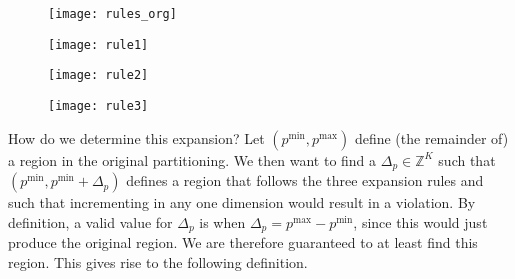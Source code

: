\begin{figure*}[ht]
    \centering
    \begin{subfigure}{0.24\textwidth}
        \texttt{[image: rules\_org]}%
        \caption{}%
        \label{fig:expRulesOrg}
    \end{subfigure}
    \begin{subfigure}{0.24\textwidth}
      \texttt{[image: rule1]}%
      \caption{}%
      \label{fig:expRules1}
    \end{subfigure}
    \begin{subfigure}{0.24\textwidth}
      \texttt{[image: rule2]}%
      \caption{}%
      \label{fig:expRules2}
    \end{subfigure}
    \begin{subfigure}{0.24\textwidth}
      \texttt{[image: rule3]}%
      \caption{}%
      \label{fig:expRules3}
    \end{subfigure}

  \caption{%
      A visual example of the 3 expansion rules. Striped regions indicate that
      the algorithm has covered this part in a previous iteration, whereas the
      shaded region with a dashed border is a candidate expanded
      region.~\cref{fig:expRulesOrg} shows a potential input partitioning.
      In~\cref{fig:expRules1} the expansion is illegal according to Rule 1,
      since the expanded region contains two different actions
      (colors).~\cref{fig:expRules2} violates Rule 2, since the expanded region
      overlaps with a striped area.~\cref{fig:expRules3} shows a representation
      of the 3rd rule, as the expansion would `cut' the rightmost region in two.
  }%
  \label{fig:simpleExample}
\end{figure*}


How do we determine this expansion? Let $(p^{\min}, p^{\max})$ define (the
remainder of) a region in the original partitioning. We then want to find a
$\Delta_p \in \mathbb{Z}^K$ such that $(p^{\min}, p^{\min} + \Delta_p)$ defines
a region that follows the three expansion rules and such that incrementing in
any one dimension would result in a violation. By definition, a valid value for
$\Delta_p$ is when $\Delta_p = p^{\max} - p^{\min}$, since this would just
produce the original region. We are therefore guaranteed to at least find this
region. This gives rise to the following definition.


